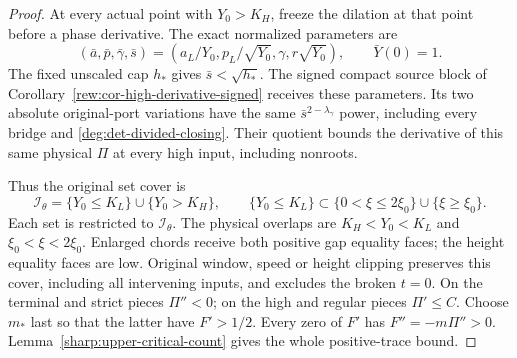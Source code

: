 \begin{proof}
At every actual point with \(Y_0>K_H\), freeze the dilation at that
point before a phase derivative. The exact normalized parameters are
\begin{equation}\label{sharp:upper-trace-high-dilation}
 (\bar a,\bar p,\bar\gamma,\bar s)=
 (a_L/Y_0,p_L/\sqrt{Y_0},\gamma,r\sqrt{Y_0}),\qquad \bar Y(0)=1.
\end{equation}
The fixed unscaled cap \(h_*\) gives \(\bar s<\sqrt{h_*}\).
The signed compact source block of
Corollary~\ref{rew:cor-high-derivative-signed} receives these parameters.
Its two absolute original-port variations have the same
\(\bar s^{2-\lambda_\gamma}\) power, including every bridge and
\eqref{deg:det-divided-closing}. Their quotient bounds the derivative
of this same physical \(\Pi\) at every high input, including nonroots.

Thus the original set cover is
\[
 \mathcal I_\theta=\{Y_0\le K_L\}\cup\{Y_0>K_H\},\qquad
 \{Y_0\le K_L\}\subset\{0<\xi\le2\xi_0\}\cup\{\xi\ge\xi_0\}.
\]
Each set is restricted to \(\mathcal I_\theta\). The physical overlaps
are \(K_H<Y_0<K_L\) and \(\xi_0<\xi<2\xi_0\). Enlarged chords
receive both positive gap equality faces; the height equality faces are
low. Original window, speed or height clipping preserves this cover,
including all intervening inputs, and excludes the broken \(t=0\).
On the terminal and strict pieces \(\Pi''<0\); on the high and
regular pieces \(\Pi'\le C\). Choose \(m_*\) last so that the latter
have \(F'>1/2\). Every zero of \(F'\) has \(F''=-m\Pi''>0\).
Lemma~\ref{sharp:upper-critical-count} gives the whole positive-trace
bound.


\end{proof}
